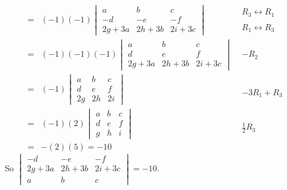 \documentclass[12pt]{article}
\newenvironment{problem}[2][Problem]
{
	\begin{trivlist} 
		\item[\hskip \labelsep {\bfseries #1 #2:}]
	}
{
	\end{trivlist}
	}
\newenvironment{solution}[1][Solution]
{
	\begin{trivlist} 
		\item[\hskip \labelsep {\itshape #1:}]
	}
	{
	\end{trivlist}
}
\begin{document}
\begin{problem}{2}
\begin{solution}
\begin{align*}
%
=& (-1)(-1)\begin{vmatrix} a&b&c\\ -d&-e&-f\\2g+3a&2h+3b&2i+3c \end{vmatrix} & \begin{matrix} R_3 \leftrightarrow R_1 \text{} \\ \text{} \\ R_1 \leftrightarrow R_3 \text{} \end{matrix} \\
%
=& (-1)(-1)(-1)\begin{vmatrix} a&b&c\\ d&e&f\\2g+3a&2h+3b&2i+3c \end{vmatrix} & \begin{matrix} \text{} \\ -R_2 \text{} \\ \text{} \end{matrix} \\
%
=& (-1)\begin{vmatrix} a&b&c\\ d&e&f\\2g&2h&2i \end{vmatrix} & \begin{matrix} \text{} \\ \text{} \\ -3R_1+R_3 \text{} \end{matrix} \\
%
=& (-1)(2)\begin{vmatrix} a&b&c\\ d&e&f\\g&h&i \end{vmatrix} & \begin{matrix} \text{} \\ \text{} \\ \frac{1}{2} R_3 \text{} \end{matrix} \\
=& -(2)(5) = -10 &
\end{align*}
So $\begin{vmatrix} -d&-e&-f\\2g+3a&2h+3b&2i+3c\\a&b&c \end{vmatrix}=-10$.
\end{solution}
\end{problem}
\end{document}
